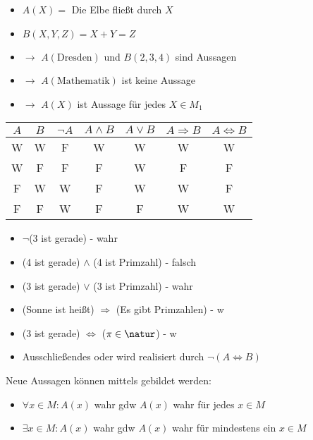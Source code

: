 \begin{example}
	\begin{itemize}
		\item $A(X)=$ Die Elbe fließt durch $X$
		\item $B(X,Y,Z)=X+Y=Z$
		\item $\to$ $A(\text{Dresden})$ und $B(2,3,4)$ sind Aussagen
		\item $\to$ $A(\text{Mathematik})$ ist keine Aussage
		\item $\to$ $A(X)$ ist Aussage für jedes $X\in M_1$
	\end{itemize}
\end{example}

\begin{center}\begin{tabular}{|c c|c c c c c|}
	\hline 
	$A$& $B$ & $\neg A$ & $A\land B$ & $A\lor B$ & $A\Rightarrow B$ & $A\iff B$ \\ 
	\hline 
	W& W & F & W & W & W & W \\ 
	W& F & F & F & W & F &  F\\ 
	F& W & W & F & W & W & F \\ 
	F& F & W & F & F & W &  W\\ 
	\hline 
\end{tabular}\end{center}

\begin{example}
	\begin{itemize}
		\item $\neg$(3 ist gerade) - wahr
		\item (4 ist gerade) $\land$ (4 ist Primzahl) - falsch
		\item (3 ist gerade) $\lor$ (3 ist Primzahl) - wahr
		\item (Sonne ist heißt) $\Rightarrow$ (Es gibt Primzahlen) - w
		\item (3 ist gerade) $\iff$ ($\pi\in\natur$) - w
		\item Ausschließendes oder wird realisiert durch $\neg(A\iff B)$
	\end{itemize}
\end{example}

\begin{*definition}[Quantoren]
	Neue Aussagen können mittels  gebildet werden:
	\begin{itemize}
		\item $\forall x\in M: A(x)$ wahr \gls{gdw} $A(x)$ wahr für jedes $x\in M$
		\item $\exists x\in M: A(x)$ wahr \gls{gdw} $A(x)$ wahr für mindestens ein $x\in M$
	\end{itemize}
\end{*definition}

